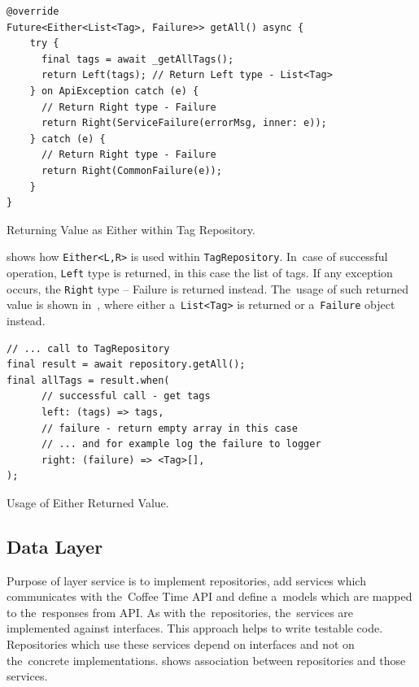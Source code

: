 \begin{listing}[ht]
\begin{verbatim}
@override
Future<Either<List<Tag>, Failure>> getAll() async {
    try {
      final tags = await _getAllTags();
      return Left(tags); // Return Left type - List<Tag>
    } on ApiException catch (e) {
      // Return Right type - Failure
      return Right(ServiceFailure(errorMsg, inner: e));
    } catch (e) {
      // Return Right type - Failure
      return Right(CommonFailure(e));
    }
}
\end{verbatim}
\caption{Returning Value as Either within Tag Repository.}
\label{listing:ct-either-repo}
\end{listing}

 shows how \verb|Either<L,R>| is used within \verb|TagRepository|. In~case of successful operation, \verb|Left| type is returned, in this case the list of tags. If any exception occurs, the \verb|Right| type -- Failure is returned instead. The~usage of such returned value is shown in~, where either a~\verb|List<Tag>| is returned or a~\verb|Failure| object instead.   

\begin{listing}[ht]
\begin{verbatim}
// ... call to TagRepository
final result = await repository.getAll();
final allTags = result.when(
      // successful call - get tags
      left: (tags) => tags,
      // failure - return empty array in this case
      // ... and for example log the failure to logger
      right: (failure) => <Tag>[], 
);
\end{verbatim}
\caption{Usage of Either Returned Value.}
\label{listing:ct-either-usage}
\end{listing}

\subsection{Data Layer}
Purpose of layer service is to implement repositories, add services which communicates with the~Coffee Time API and define a~models which are mapped to the~responses from API. As with the~repositories, the~services are implemented against interfaces. This approach helps to write testable code. Repositories which use these services depend on interfaces and not on the~concrete implementations.  shows association between repositories and those services. 

